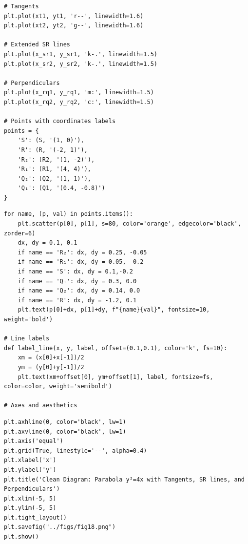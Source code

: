 \documentclass{beamer}
\theoremstyle{remark}
\numberwithin{equation}{section}
\numberwithin{equation}{section}
\begin{document}
\begin{frame}[fragile]
\begin{lstlisting}
# Tangents
plt.plot(xt1, yt1, 'r--', linewidth=1.6)
plt.plot(xt2, yt2, 'g--', linewidth=1.6)

# Extended SR lines
plt.plot(x_sr1, y_sr1, 'k-.', linewidth=1.5)
plt.plot(x_sr2, y_sr2, 'k-.', linewidth=1.5)

# Perpendiculars
plt.plot(x_rq1, y_rq1, 'm:', linewidth=1.5)
plt.plot(x_rq2, y_rq2, 'c:', linewidth=1.5)

# Points with coordinates labels
points = {
    'S': (S, '(1, 0)'),
    'R': (R, '(-2, 1)'),
    'R₂': (R2, '(1, -2)'),
    'R₁': (R1, '(4, 4)'),
    'Q₂': (Q2, '(1, 1)'),
    'Q₁': (Q1, '(0.4, -0.8)')   
}
\end{lstlisting}
\end{frame}
\begin{frame}[fragile]
\begin{lstlisting}
for name, (p, val) in points.items():
    plt.scatter(p[0], p[1], s=80, color='orange', edgecolor='black', zorder=6)
    dx, dy = 0.1, 0.1
    if name == 'R₂': dx, dy = 0.25, -0.05
    if name == 'R₁': dx, dy = 0.05, -0.2
    if name == 'S': dx, dy = 0.1,-0.2
    if name == 'Q₁': dx, dy = 0.3, 0.0
    if name == 'Q₂': dx, dy = 0.14, 0.0
    if name == 'R': dx, dy = -1.2, 0.1
    plt.text(p[0]+dx, p[1]+dy, f"{name}{val}", fontsize=10, weight='bold')

# Line labels
def label_line(x, y, label, offset=(0.1,0.1), color='k', fs=10):
    xm = (x[0]+x[-1])/2
    ym = (y[0]+y[-1])/2
    plt.text(xm+offset[0], ym+offset[1], label, fontsize=fs, color=color, weight='semibold')

# Axes and aesthetics
\end{lstlisting}
\end{frame}
\begin{frame}[fragile]
\begin{lstlisting}
plt.axhline(0, color='black', lw=1)
plt.axvline(0, color='black', lw=1)
plt.axis('equal')
plt.grid(True, linestyle='--', alpha=0.4)
plt.xlabel('x')
plt.ylabel('y')
plt.title('Clean Diagram: Parabola y²=4x with Tangents, SR lines, and Perpendiculars')
plt.xlim(-5, 5)
plt.ylim(-5, 5)
plt.tight_layout()
plt.savefig("../figs/fig18.png")
plt.show()

\end{lstlisting}
\end{frame}
\end{document}
